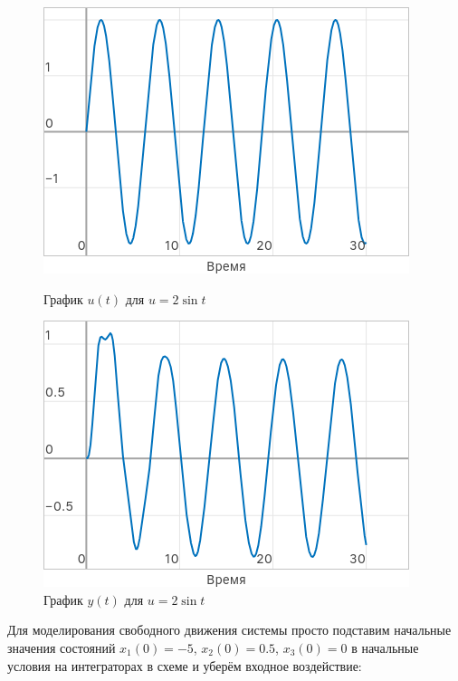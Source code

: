 \documentclass[a4paper]{article}
\begin{document}
\begin{figure}[H]
    \centering
    \begin{minipage}{0.4\textwidth}
        \includegraphics[width=\textwidth]{sources/task2_2sint_u.png}
        \caption*{График $u(t)$ для $u=2\sin{t}$}
    \end{minipage}
    \hspace{2em}
    \begin{minipage}{0.4\textwidth}
        \includegraphics[width=\textwidth]{sources/task2_2sint_y.png}
        \caption*{График $y(t)$ для $u=2\sin{t}$}
    \end{minipage}
\end{figure}
Для моделирования свободного движения системы просто подставим начальные значения состояний $x_1(0)=-5$, $x_2(0)=0.5$, $x_3(0)=0$ в начальные условия на интеграторах в схеме и уберём входное воздействие:
\end{document}
